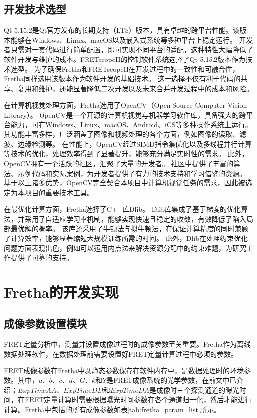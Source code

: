\subsection{开发技术选型}
\ifshowtext
Qt 5.15.2是Qt官方发布的长期支持（LTS）版本，具有卓越的跨平台性能。该版本能够在Windows、Linux、macOS以及嵌入式系统等多种平台上稳定运行。
开发者只需对一套代码进行简单配置，即可实现不同平台的适配，这种特性大幅降低了软件开发与维护的成本。FRETscopeII的控制软件系统选择了Qt 5.15.2版本作为技术选型。
为了确保Fretha和FRETscopeII在开发过程中的一致性和可融合性，Fretha同样选用该版本作为软件开发的基础技术。
这一选择不仅有利于代码的共享、复用和维护，还能显著降低二次开发以及未来合并开发过程中的成本和风险。

在计算机视觉处理方面，Fretha选用了OpenCV（Open Source Computer Vision Library）。
OpenCV是一个开源的计算机视觉与机器学习软件库，具备强大的跨平台能力，可在Windows、Linux、macOS、Android、iOS等多种操作系统上运行。
其功能丰富多样，广泛涵盖了图像和视频处理的各个方面，例如图像的读取、滤波、边缘检测等。
在性能上，OpenCV经过SIMD指令集优化以及多线程并行计算等技术的优化，处理效率得到了显著提升，能够充分满足实时性的需求。
此外，OpenCV拥有一个活跃的社区，汇聚了大量的开发者。
社区中提供了丰富的算法、示例代码和实际案例，为开发者提供了有力的技术支持和学习借鉴的资源。
基于以上诸多优势，OpenCV完全契合本项目中计算机视觉任务的需求，因此被选定为本项目的重要技术工具。

在最优化计算方面，Fretha选择了C++库Dlib。
Dlib库集成了基于梯度的优化算法，并采用了自适应学习率机制，能够实现快速且稳定的收敛，有效降低了陷入局部最优解的概率。
该库还采用了牛顿法与拟牛顿法，在保证计算精度的同时兼顾了计算效率，能够显著缩短大规模训练所需的时间。
此外，Dlib在处理约束优化问题方面表现出色，例如可以运用内点法来解决资源分配中的约束难题，为研究工作提供了可靠的支持。  
\fi

\section{Fretha的开发实现}

\subsection{成像参数设置模块}
\ifshowtext
FRET定量分析中，测量并设置成像过程时的成像参数至关重要。Fretha作为离线数据处理软件，在数据处理前需要设置好FRET定量计算过程中必须的参数。

FRET成像参数在Fretha中以静态参数保存在软件内存中，是数据处理时的环境参数。其中，$a$、$b$、$c$、$d$、$G$、$k$和$Y$是FRET成像系统的光学参数，在前文中已介绍；$ExpTimeAA$、$ExpTimeDD$和$ExpTimeDA$是成像时三个探测通道的曝光时间，在FRET定量计算时需要根据曝光时间参数在各个通道归一化，然后才能进行计算。Fretha中包括的所有成像参数如表\ref{tab:fretha_param_list}所示。

